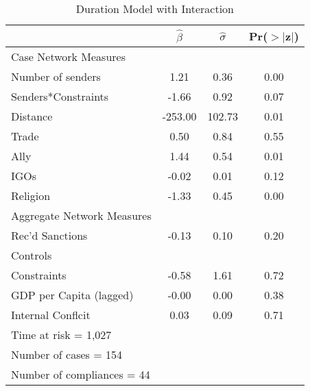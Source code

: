 \begin{table}[ht]
	\begin{center}
			\begin{tabular}{lccc}
			\caption{Duration Model with Interaction}
			\hline\hline
			&$\hat{\beta}$&$\hat{\sigma}$& Pr($>$$|$z$|$) \\
			\hline
			Case Network Measures \\		
			\;\;\; Number of senders & 1.21 & 0.36 & 0.00 \\ 
			\;\;\; Senders*Constraints & -1.66 & 0.92 & 0.07 \\ 		
			\;\;\; Distance & -253.00 & 102.73 & 0.01 \\ 		
			\;\;\; Trade & 0.50 & 0.84 & 0.55 \\ 
			\;\;\; Ally & 1.44 & 0.54 & 0.01 \\ 
			\;\;\; IGOs & -0.02 & 0.01 & 0.12 \\		
			\;\;\; Religion & -1.33 & 0.45 & 0.00 \\ 
			Aggregate Network Measures \\		
			\;\;\; Rec'd Sanctions & -0.13 & 0.10 & 0.20 \\ 
			Controls \\		
			\;\;\; Constraints & -0.58 & 1.61 & 0.72 \\ 
			\;\;\; GDP per Capita (lagged) & -0.00 & 0.00 & 0.38 \\ 
			\;\;\; Internal Conflcit & 0.03 & 0.09 & 0.71 \\ 
			\hline
			Time at risk = 1,027 &&&\\
			Number of cases = 154 &&&\\
			Number of compliances = 44 &&&\\
			\hline\hline
	\end{tabular}	
	\end{center}
\end{table}